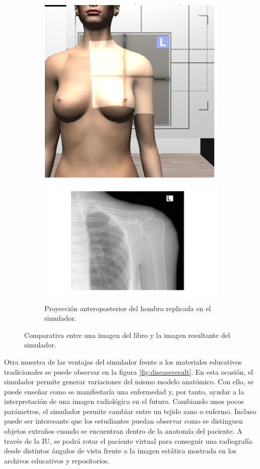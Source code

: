 \begin{figure}[ht]
\begin{subfigure}[b]{0.45\linewidth}
        {\includegraphics[width=\linewidth]{IMG/XRayshoulder3.png}}
        \caption{Proyección anteroposterior del hombro replicada en el simulador.}
    \end{subfigure}
    \caption{\label{fig:xraycomp} Comparativa entre una imagen del libro \cite{carver2012medical} y la imagen resultante del simulador.}
   \end{figure}

Otra muestra de las ventajas del simulador frente a los materiales educativos tradicionales se puede observar en la figura \ref{fig:diseaseresult}. En esta ocasión, el simulador permite generar variaciones del mismo modelo anatómico. Con ello, se puede enseñar como se manifestaría una enfermedad y, por tanto, ayudar a la interpretación de una imagen radiológica en el futuro. Cambiando unos pocos parámetros, el simulador permite cambiar entre un tejido sano o enfermo. Incluso puede ser interesante que los estudiantes puedan observar como se distinguen objetos extraños cuando se encuentran dentro de la anatomía del paciente. A través de la \ac{IU}, se podrá rotar el paciente virtual para conseguir una radiografía desde distintos ángulos de vista frente a la imagen estática mostrada en los archivos educativos y repositorios.

